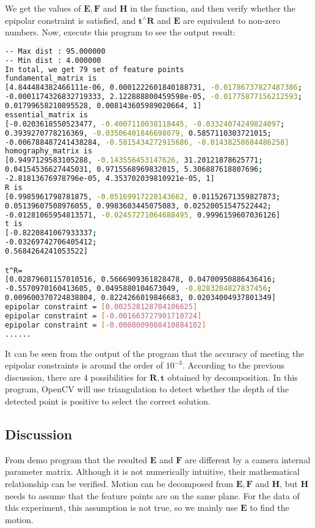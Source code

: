 We get the values of $\bm{E}, \bm{F}$ and $\bm{H}$ in the function, and then verify whether the epipolar constraint is satisfied, and $\bm{t}^ \wedge \bm{R}$ and $\bm{E}$ are equivalent to non-zero numbers. Now, execute this program to see the output result:
\begin{lstlisting}[language=sh,caption=Terminal Input：]
% build/pose_estimation_2d2d 1.png 2.png
-- Max dist : 95.000000 
-- Min dist : 4.000000 
In total, we get 79 set of feature points
fundamental_matrix is 
[4.844484382466111e-06, 0.0001222601840188731, -0.01786737827487386;
-0.0001174326832719333, 2.122888800459598e-05, -0.01775877156212593;
0.01799658210895528, 0.008143605989020664, 1]
essential_matrix is 
[-0.0203618550523477, -0.4007110038118445, -0.03324074249824097;
0.3939270778216369, -0.03506401846698079, 0.5857110303721015;
-0.006788487241438284, -0.5815434272915686, -0.01438258684486258]
homography_matrix is 
[0.9497129583105288, -0.143556453147626, 31.20121878625771;
0.04154536627445031, 0.9715568969832015, 5.306887618807696;
-2.81813676978796e-05, 4.353702039810921e-05, 1]
R is 
[0.9985961798781875, -0.05169917220143662, 0.01152671359827873;
0.05139607508976055, 0.9983603445075083, 0.02520051547522442;
-0.01281065954813571, -0.02457271064688495, 0.9996159607036126]
t is 
[-0.8220841067933337;
-0.03269742706405412;
0.5684264241053522]

t^R=
[0.02879601157010516, 0.5666909361828478, 0.04700950886436416;
-0.5570970160413605, 0.0495880104673049, -0.8283204827837456;
0.009600370724838804, 0.8224266019846683, 0.02034004937801349]
epipolar constraint = [0.002528128704106625]
epipolar constraint = [-0.001663727901710724]
epipolar constraint = [-0.0008009088410884102]
......
\end{lstlisting}

It can be seen from the output of the program that the accuracy of meeting the epipolar constraints is around the order of $10 ^{-3}$. According to the previous discussion, there are 4 possibilities for $\bm{R}, \bm{t}$ obtained by decomposition. In this program, OpenCV will use triangulation to detect whether the depth of the detected point is positive to select the correct solution.

\subsection*{Discussion}
From demo program that the resulted $\bm{E}$ and $\bm{F}$ are different by a camera internal parameter matrix. Although it is not numerically intuitive, their mathematical relationship can be verified. Motion can be decomposed from $\bm{E}, \bm{F}$ and $\bm{H}$, but $\bm{H}$ needs to assume that the feature points are on the same plane. For the data of this experiment, this assumption is not true, so we mainly use $\bm{E}$ to find the motion.

